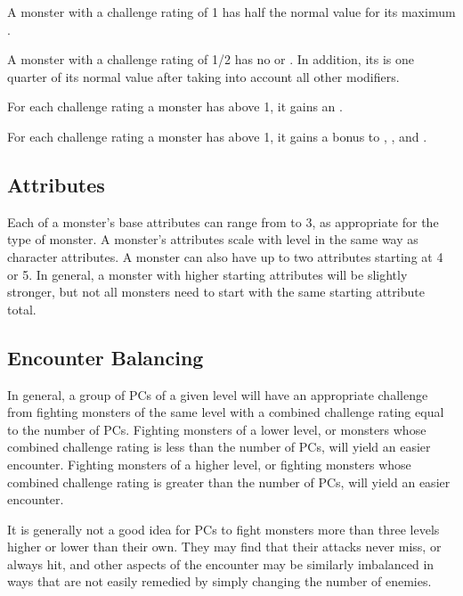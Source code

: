          A monster with a challenge rating of 1 has half the normal value for its maximum .

         A monster with a challenge rating of 1/2 has no  or .
        In addition, its  is one quarter of its normal value after taking into account all other modifiers.

         For each challenge rating a monster has above 1, it gains an .

         For each challenge rating a monster has above 1, it gains a  bonus to , , and .

    \subsection{Attributes}
        Each of a monster's base attributes can range from  to 3, as appropriate for the type of monster.
        A monster's attributes scale with level in the same way as character attributes.
        A monster can also have up to two attributes starting at 4 or 5.
        In general, a monster with higher starting attributes will be slightly stronger, but not all monsters need to start with the same starting attribute total.

    \subsection{Encounter Balancing}\label{Encounter Balancing}
        In general, a group of PCs of a given level will have an appropriate challenge from fighting monsters of the same level with a combined challenge rating equal to the number of PCs.
        Fighting monsters of a lower level, or monsters whose combined challenge rating is less than the number of PCs, will yield an easier encounter.
        Fighting monsters of a higher level, or fighting monsters whose combined challenge rating is greater than the number of PCs, will yield an easier encounter.

        It is generally not a good idea for PCs to fight monsters more than three levels higher or lower than their own.
        They may find that their attacks never miss, or always hit, and other aspects of the encounter may be similarly imbalanced in ways that are not easily remedied by simply changing the number of enemies.


